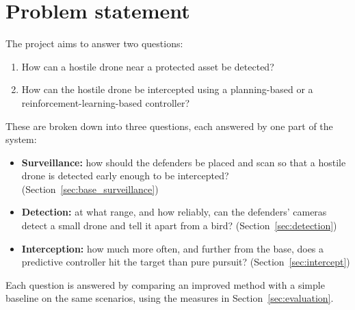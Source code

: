 \section{Problem statement}
The project aims to answer two questions:
\begin{enumerate}
    \item How can a hostile drone near a protected asset be detected?
    \item How can the hostile drone be intercepted using a planning-based
          or a reinforcement-learning-based controller?
\end{enumerate}

These are broken down into three questions, each answered by one part of
the system:
\begin{itemize}
    \item \textbf{Surveillance:} how should the defenders be placed and scan
          so that a hostile drone is detected early enough to be intercepted?
          (Section~\ref{sec:base_surveillance})
    \item \textbf{Detection:} at what range, and how reliably, can the
          defenders' cameras detect a small drone and tell it apart from a
          bird? (Section~\ref{sec:detection})
    \item \textbf{Interception:} how much more often, and further from the
          base, does a predictive controller hit the target than pure
          pursuit? (Section~\ref{sec:intercept})
\end{itemize}

Each question is answered by comparing an improved method with a simple
baseline on the same scenarios, using the measures in
Section~\ref{sec:evaluation}. 
